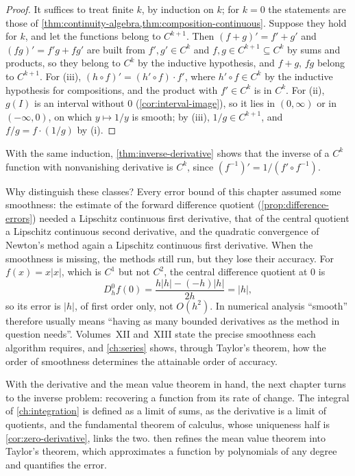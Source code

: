 \begin{proof}
It suffices to treat finite $k$, by induction on $k$; for $k=0$ the statements are those of \cref{thm:continuity-algebra,thm:composition-continuous}. Suppose they hold for $k$, and let the functions belong to $C^{k+1}$. Then $(f+g)'=f'+g'$ and $(fg)'=f'g+fg'$ are built from $f',g'\in C^k$ and $f,g\in C^{k+1}\subseteq C^k$ by sums and products, so they belong to $C^k$ by the inductive hypothesis, and $f+g$, $fg$ belong to $C^{k+1}$. For (iii), $(h\circ f)'=(h'\circ f)\cdot f'$, where $h'\circ f\in C^k$ by the inductive hypothesis for compositions, and the product with $f'\in C^k$ is in $C^k$. For (ii), $g(I)$ is an interval without $0$ (\cref{cor:interval-image}), so it lies in $(0,\infty)$ or in $(-\infty,0)$, on which $y\mapsto1/y$ is smooth; by (iii), $1/g\in C^{k+1}$, and $f/g=f\cdot(1/g)$ by (i).
\end{proof}

With the same induction, \cref{thm:inverse-derivative} shows that the inverse of a $C^k$ function with nonvanishing derivative is $C^k$, since $(f^{-1})'=1/(f'\circ f^{-1})$.

Why distinguish these classes? Every error bound of this chapter assumed some smoothness: the estimate of the forward difference quotient (\cref{prop:difference-errors}) needed a Lipschitz continuous first derivative, that of the central quotient a Lipschitz continuous second derivative, and the quadratic convergence of Newton's method again a Lipschitz continuous first derivative. When the smoothness is missing, the methods still run, but they lose their accuracy. For $f(x)=x|x|$, which is $C^1$ but not $C^2$, the central difference quotient at $0$ is
\[
D_h^0f(0)=\frac{h|h|-(-h)|h|}{2h}=|h| ,
\]
so its error is $|h|$, of first order only, not $O(h^2)$. In numerical analysis ``smooth'' therefore usually means ``having as many bounded derivatives as the method in question needs''. Volumes~XII and~XIII state the precise smoothness each algorithm requires, and \cref{ch:series} shows, through Taylor's theorem, how the order of smoothness determines the attainable order of accuracy.

\bigskip
With the derivative and the mean value theorem in hand, the next chapter turns to the inverse problem: recovering a function from its rate of change. The integral of \cref{ch:integration} is defined as a limit of sums, as the derivative is a limit of quotients, and the fundamental theorem of calculus, whose uniqueness half is \cref{cor:zero-derivative}, links the two.  then refines the mean value theorem into Taylor's theorem, which approximates a function by polynomials of any degree and quantifies the error.

